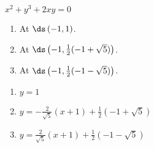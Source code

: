 {$x^2+y^3+2xy=0$
\begin{enumerate}
\item	At $\ds \left(-1,1\right)$.
\item	At $\ds\left(-1,\frac12(-1+\sqrt{5})\right)$.
\item	At $\ds\left(-1,\frac12(-1-\sqrt{5})\right)$.
\end{enumerate}
}
{\begin{enumerate}
\item	$y=1$
\item	$y =-\frac{2}{\sqrt{5}}(x+1)+\frac12(-1+\sqrt{5})$
\item	$y =\frac{2}{\sqrt{5}}(x+1)+\frac12(-1-\sqrt{5})$
\end{enumerate}
}
